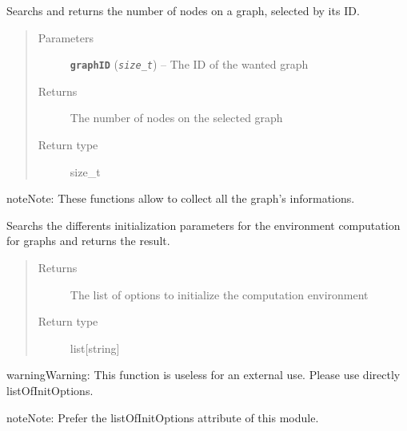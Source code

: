 \documentclass[letterpaper,10pt,english]{sphinxmanual}
\begin{document}

\begin{fulllineitems}
\label{doc:PythonGedLib.PyGetGraphNumNodes}
Searchs and returns the number of nodes on a graph, selected by its ID.
\begin{quote}\begin{description}
\item[{Parameters}] \leavevmode
\textbf{\texttt{graphID}} (\emph{\texttt{size\_t}}) -- The ID of the wanted graph

\item[{Returns}] \leavevmode
The number of nodes on the selected graph

\item[{Return type}] \leavevmode
size\_t

\end{description}\end{quote}

\begin{notice}{note}{Note:}
These functions allow to collect all the graph's informations.
\end{notice}

\end{fulllineitems}


\begin{fulllineitems}
\label{doc:PythonGedLib.PyGetInitOptions}
Searchs the differents initialization parameters for the environment computation for graphs and returns the result.
\begin{quote}\begin{description}
\item[{Returns}] \leavevmode
The list of options to initialize the computation environment

\item[{Return type}] \leavevmode
list{[}string{]}

\end{description}\end{quote}

\begin{notice}{warning}{Warning:}
This function is useless for an external use. Please use directly listOfInitOptions.
\end{notice}

\begin{notice}{note}{Note:}
Prefer the listOfInitOptions attribute of this module.
\end{notice}

\end{fulllineitems}
\end{document}
